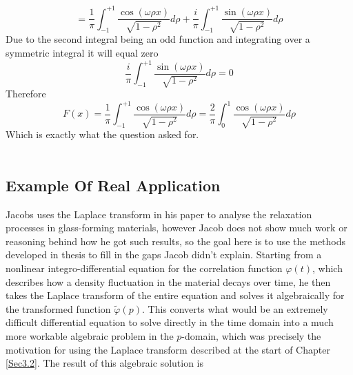 \begin{equation}
    =\frac{1}{\pi}\int^{+1}_{-1}\frac{\cos(\omega\rho x)}{\sqrt{1-\rho^2}}d\rho+\frac{i}{\pi}\int^{+1}_{-1}\frac{\sin(\omega\rho x)}{\sqrt{1-\rho^2}}d\rho
\end{equation}
Due to the second integral being an odd function and integrating over a symmetric integral it will equal zero $$\frac{i}{\pi}\int^{+1}_{-1}\frac{\sin(\omega\rho x)}{\sqrt{1-\rho^2}}d\rho=0$$ Therefore 
\begin{equation}
    F(x)=\frac{1}{\pi}\int^{+1}_{-1}\frac{\cos(\omega\rho x)}{\sqrt{1-\rho^2}}d\rho=\frac{2}{\pi}\int^{1}_{0}\frac{\cos(\omega\rho x)}{\sqrt{1-\rho^2}}d\rho
\end{equation}
Which is exactly what the question asked for. 
\\
\\












\subsection{Example Of Real Application}\label{jacobs}

Jacobs \cite{Glass} uses the Laplace transform in his paper to analyse the relaxation processes 
in glass-forming materials, however Jacob does not show much work or reasoning behind how he got such results, so the goal here is to use the methods developed in thesis to fill in the gaps Jacob didn't explain. Starting from a nonlinear integro-differential equation 
for the correlation function $\varphi(t)$, which describes how a density fluctuation 
in the material decays over time, he then takes the Laplace transform of the entire 
equation and solves it algebraically for the transformed function $\tilde{\varphi}(p)$. 
This converts what would be an extremely difficult differential equation to solve 
directly in the time domain into a much more workable algebraic problem in the 
$p$-domain, which was precisely the motivation for using the Laplace transform 
described at the start of Chapter \ref{Sec3.2}. The result of this algebraic solution is

